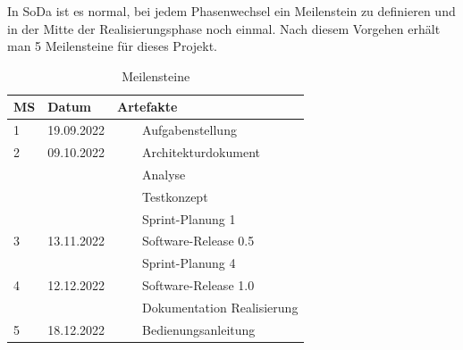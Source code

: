 \documentclass[a4paper, table]{article}
\newcommand{\tabitem}{~~\llap{\textbullet}~~}
\begin{document}
In SoDa ist es normal, bei jedem Phasenwechsel ein Meilenstein zu definieren und in der Mitte der
Realisierungsphase noch einmal. \autocite{jenny_projektmanagement_2016} %
Nach diesem Vorgehen erhält man 5 Meilensteine für dieses Projekt.

\begin{table}[h]
    \centering
    \begin{tabular}{|l|l|l|}
        \hline
        \rowcolor[gray]{.9} MS & Datum & Artefakte \\
        \hline
        1 & 19.09.2022 & \tabitem Aufgabenstellung \\
        \hline
        2 & 09.10.2022 & \tabitem Architekturdokument \\
         & & \tabitem Analyse \\
         & & \tabitem Testkonzept \\
         & & \tabitem Sprint-Planung 1 \\
        \hline
        3 & 13.11.2022 & \tabitem Software-Release 0.5 \\
         & & \tabitem Sprint-Planung 4 \\
        \hline
        4 & 12.12.2022 & \tabitem Software-Release 1.0 \\
         & & \tabitem Dokumentation Realisierung \\
        \hline
        5 & 18.12.2022 & \tabitem Bedienungsanleitung \\
        \hline
    \end{tabular}
    \caption{Meilensteine}
    \label{tab: Meilensteine}
\end{table}
\clearpage
\end{document}
